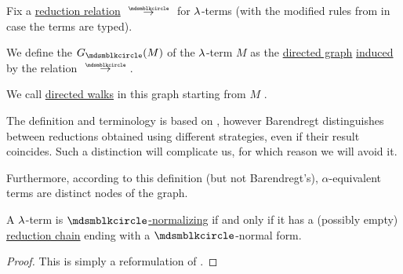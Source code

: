 \begin{definition}\label{def:lambda_term_reduction_graph}\mimprovised
  Fix a \hyperref[def:lambda_term_reduction]{reduction relation} \( {\pred} \) for \( {\mathrm \lambda} \)-terms (with the modified rules from  in case the terms are typed).

  We define the  \( G_{\Anon}(M) \) of the \( {\mathrm \lambda} \)-term \( M \) as the \hyperref[def:directed_graph]{directed graph} \hyperref[def:directed_graph_induced_by_relation]{induced} by the relation \( {\pred} \).

  We call \hyperref[def:graph_walk/directed]{directed walks} in this graph starting from \( M \) .
\end{definition}
\begin{comments}
  \item The definition and terminology is based on , however Barendregt distinguishes between reductions obtained using different strategies, even if their result coincides. Such a distinction will complicate us, for which reason we will avoid it.

  Furthermore, according to this definition (but not Barendregt's), \( \alpha \)-equivalent terms are distinct nodes of the graph.
\end{comments}

\begin{proposition}\label{thm:term_normalizing_iff_exists_finite_reduction_chain}
  A \( {\mathrm \lambda} \)-term is \hyperref[def:lambda_term_normal_form]{\( \Anon \)-normalizing} if and only if it has a (possibly empty) \hyperref[def:lambda_term_reduction_graph]{reduction chain} ending with a \( \Anon \)-normal form.
\end{proposition}
\begin{proof}
  This is simply a reformulation of .
\end{proof}

